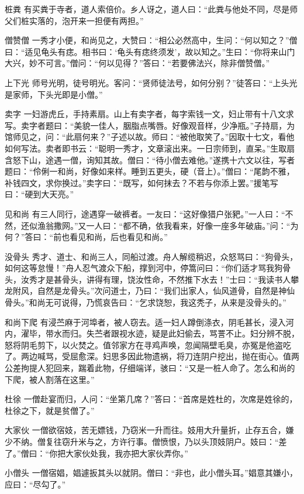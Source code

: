 \documentclass[12pt,UTF8]{ctexbook}
\begin{document}
桩粪
有买粪于寺者，道人索倍价。乡人讶之，道人曰：“此粪与他处不同，尽是师父们桩实落的，泡开来一担便有两担。”

僧赞僧
一秀才小便，和尚见之，大赞曰：“相公必然高中，生问：“何以知之？”僧曰：“适见龟头有痣。相书曰：‘龟头有痣终须发’，故以知之。”生曰：“你将来山门大兴，妙不可言。”僧问：“何以见得？”答曰：“若要佛法兴，除非僧赞僧。”

上下光
师号光明，徒号明光。客问：“贤师徒法号，如何分别？”徒答曰：“上头光是家师，下头光即是小僧。”

卖字
一妇游虎丘，手持素扇。山上有卖字者，每字索钱一文，妇止带有十八文求写。卖字者题曰：“美貌一佳人，胭脂点嘴唇。好像观音样，少净瓶。”子持扇，为馆师见之，问：“此扇何来？”子述以故。师曰：“被他取笑了。”因取十七文，看他如何写法。卖者即书云：“聪明一秀才，文章滚出来。一日宗师到，直呆。”生取扇含怒下山，途遇一僧，询知其故。僧曰：“待小僧去难他。”遂携十六文以往，写者题曰：“伶俐一和尚，好像如来样。睡到五更头，硬（音上）。”僧曰：“尾韵不雅，补钱四文，求你换过。”卖字曰：“既写，如何抹去？不若与你添上罢。”援笔写曰：“硬到大天亮。”

见和尚
有三人同行，途遇穿一破裤者。一友曰：“这好像猎户张豝。”一人曰：“不然，还似渔翁撒网。”又一人曰：“都不确，依我看来，好像一座多年破庙。”问：“为何？”答曰：“前也看见和尚，后也看见和尚。”

没骨头
秀才、道士、和尚三人，同船过渡。舟人解缆稍迟，众怒骂曰：“狗骨头，如何这等怠慢！”舟人忍气渡众下船，撑到河中，停篙问曰：“你们适才骂我狗骨头，汝秀才是甚骨头，讲得有理，饶汝性命，不然推下水去！”士曰：“我读书人攀龙附风，自然是龙骨头。”次问道士，乃曰：“我们出家人，仙风道骨，自然是神仙骨头。”和尚无可说得，乃慌哀告曰：“乞求饶恕，我这秃子，从来是没骨头的。”

和尚下爬
有浸苎麻于河埠者，被人窃去。适一妇人蹲倒涤衣，阴毛甚长，浸入河内，濯毕，带水而归。失苎者跟视水迹，疑是此妇偷去，骂詈不止。妇分辨不脱，怒将阴毛剪下，以火焚之。值邻家方在寻鸡声唤，忽闻隔壁毛臭，亦冤是他盗吃了。两边喊骂，受屈愈深。妇思多因此物遗祸，将刀连阴户挖出，抛在街心。值两公差拘提人犯回来，踹着此物，仔细端详，骇曰：“又是一桩人命了。怎么和尚的下爬，被人割落在这里。”

杜徐
一僧赴宴而归，人问：“坐第几席？”答曰：“首席是姓杜的，次席是姓徐的，杜徐之下，就是贫僧了。”

大家伙
一僧欲宿妓，苦无嫖钱，乃窃米一升而往。妓用大升量折，止存五合，嫌少不纳。僧复往窃升米与之，方许行事。僧愤恨，乃以头顶妓阴户。妓曰：“差了。”僧曰：“你把大家伙处我，我亦把大家伙弄你。”

小僧头
一僧宿娼，娼遽扳其头以就阴。僧曰：“非也，此小僧头耳。”娼意其嫌小，应曰：“尽勾了。”
\end{document}

